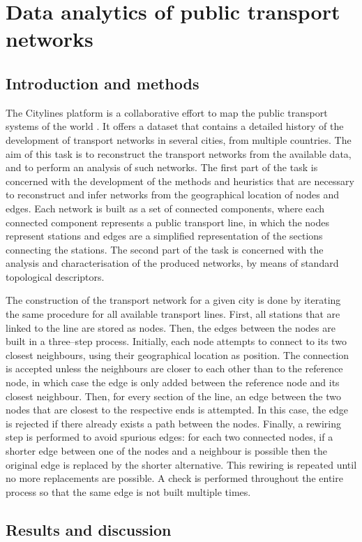 \chapter{Data analytics of public transport networks}


\section{Introduction and methods}
 The Citylines platform is a collaborative effort to map the public transport systems of the world \cite{Citylines}. It offers a dataset that contains a detailed history of the development of transport networks in several cities, from multiple countries. The aim of this task is to reconstruct the transport networks from the available data, and to perform an analysis of such networks. The first part of the task is concerned with the development of the methods and heuristics that are necessary to reconstruct and infer networks from the geographical location of nodes and edges. Each network is built as a set of connected components, where each connected component represents a public transport line, in which the nodes represent stations and edges are a simplified representation of the sections connecting the stations. The second part of the task is concerned with the analysis and characterisation of the produced networks, by means of standard topological descriptors.
 
 The construction of the transport network for a given city is done by iterating the same procedure for all available transport lines. First, all stations that are linked to the line are stored as nodes. Then, the edges between the nodes are built in a three--step process. Initially, each node attempts to connect to its two closest neighbours, using their geographical location as position. The connection is accepted unless the neighbours are closer to each other than to the reference node, in which case the edge is only added between the reference node and its closest neighbour. Then, for every section of the line, an edge between the two nodes that are closest to the respective ends is attempted. In this case, the edge is rejected if there already exists a path between the nodes. Finally, a rewiring step is performed to avoid spurious edges: for each two connected nodes, if a shorter edge between one of the nodes and a neighbour is possible then the original edge is replaced by the shorter alternative. This rewiring is repeated until no more replacements are possible. A check is performed throughout the entire process so that the same edge is not built multiple times.


\section{Results and discussion}



\newpage